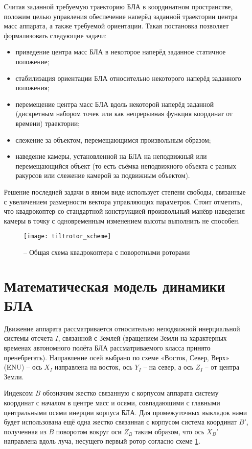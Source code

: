 Считая заданной требуемую траекторию БЛА в координатном пространстве, положим целью управления обеспечение наперёд заданной траектории центра масс аппарата, а также требуемой ориентации. Такая постановка позволяет формализовать следующие задачи:
\begin{itemize}
\item приведение центра масс БЛА в некоторое наперёд заданное статичное положение;
\item стабилизация ориентации БЛА относительно некоторого наперёд заданного положения;
\item перемещение центра масс БЛА вдоль некоторой наперёд заданной (дискретным набором точек или как непрерывная функция координат от времени) траектории;
\item слежение за объектом, перемещающимся произвольным образом;
\item наведение камеры, установленной на БЛА на неподвижный или перемещающийся объект (то есть съёмка неподвижного объекта с разных ракурсов или слежение камерой за подвижным объектом).
\end{itemize}

Решение последней задачи в явном виде использует степени свободы, связанные с увеличением размерности вектора управляющих параметров. Стоит отметить, что квадрокоптер со стандартной конструкцией произвольный манёвр наведения камеры в точку с одновременным изменением высоты выполнить не способен.
\begin{figure}[h]
	\centering
	\texttt{[image: tiltrotor\_scheme]}
	\caption{ -- Общая схема квадрокоптера с поворотными роторами}
	\label{fig:tiltrotor_scheme}
\end{figure}

\section{Математическая модель динамики БЛА}

Движение аппарата рассматривается относительно неподвижной инерциальной системы отсчета $I$, связанной с Землей (вращением Земли на характерных временах автономного полёта БЛА рассматриваемого класса принято пренебрегать).
Направление осей выбрано по схеме «Восток, Север, Верх» (ENU) -- ось \textbf{$X_I$} направлена на восток, ось \textbf{$Y_I$} -- на север, а ось \textbf{$Z_I$} -- от центра Земли.

Индексом $B$ обозначим жестко связанную с корпусом аппарата систему координат с началом в центре масс и осями, совпадающими с главными центральными осями инерции корпуса БЛА.
Для промежуточных выкладок нами будет использована ещё одна жестко связанная с корпусом система координат $B'$, полученная из $B$ поворотом вокруг оси $Z_B$ таким образом, что ось $X_B'$ направлена вдоль луча, несущего первый ротор согласно схеме \ref{fig:tiltrotor_scheme}.

